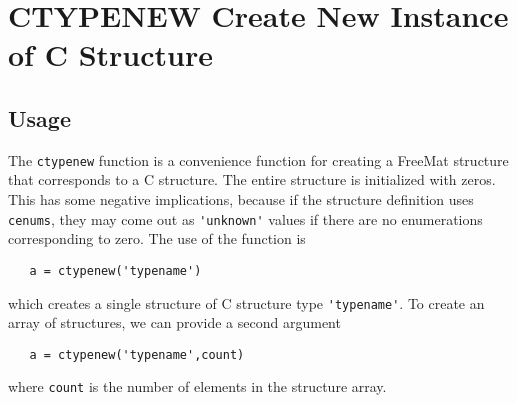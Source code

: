 \section{CTYPENEW Create New Instance of C Structure}

\subsection{Usage}

The \verb|ctypenew| function is a convenience function for
creating a FreeMat structure that corresponds to a C
structure.  The entire structure is initialized with zeros.
This has some negative implications, because if the 
structure definition uses \verb|cenums|, they may come out
as \verb|'unknown'| values if there are no enumerations corresponding
to zero.  The use of the function is
\begin{verbatim}
   a = ctypenew('typename')
\end{verbatim}
which creates a single structure of C structure type \verb|'typename'|.
To create an array of structures, we can provide a second argument
\begin{verbatim}
   a = ctypenew('typename',count)
\end{verbatim}
where \verb|count| is the number of elements in the structure array.
